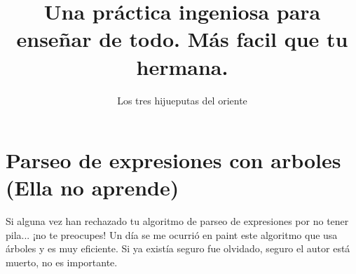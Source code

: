 \documentclass{article}
\title{Una práctica ingeniosa para enseñar de todo. Más facil que tu hermana.}
\author{Los tres hijueputas del oriente}
\begin{document}
	
	
	{\centering \section*{Parseo de expresiones con arboles (Ella no aprende)}}
	
	Si alguna vez han rechazado tu algoritmo de parseo de expresiones por no tener pila... ¡no te preocupes! Un día se me ocurrió en paint este algoritmo que usa árboles y es muy eficiente. Si ya existía seguro fue olvidado, seguro el autor está muerto, no es importante.
	
\end{document}
